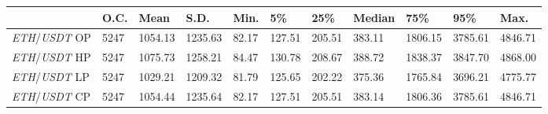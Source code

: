 \begin{tabular}{lllllllllll}
\toprule
 & \textbf{O.C.} & \textbf{Mean} & \textbf{S.D.} & \textbf{Min.} & \textbf{5\%} & \textbf{25\%} & \textbf{Median} & \textbf{75\%} & \textbf{95\%} & \textbf{Max.} \\
\midrule
\emph{ETH}/\emph{USDT} OP & 5247 & 1054.13 & 1235.63 & 82.17 & 127.51 & 205.51 & 383.11 & 1806.15 & 3785.61 & 4846.71 \\
\emph{ETH}/\emph{USDT} HP & 5247 & 1075.73 & 1258.21 & 84.47 & 130.78 & 208.67 & 388.72 & 1838.37 & 3847.70 & 4868.00 \\
\emph{ETH}/\emph{USDT} LP & 5247 & 1029.21 & 1209.32 & 81.79 & 125.65 & 202.22 & 375.36 & 1765.84 & 3696.21 & 4775.77 \\
\emph{ETH}/\emph{USDT} CP & 5247 & 1054.44 & 1235.64 & 82.17 & 127.51 & 205.51 & 383.14 & 1806.36 & 3785.61 & 4846.71 \\
\bottomrule
\end{tabular}

